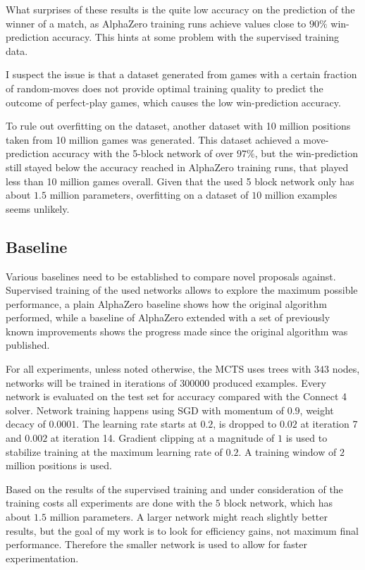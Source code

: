 \documentclass[12pt,onecolumn,oneside,titlepage]{article}
\begin{document}
What surprises of these results is the quite low accuracy on the prediction of the winner of a match, as AlphaZero training runs achieve values close to $90\%$ win-prediction accuracy.
This hints at some problem with the supervised training data.

I suspect the issue is that a dataset generated from games with a certain fraction of random-moves does not provide optimal training quality to predict the outcome of perfect-play games, which causes the low win-prediction accuracy.

To rule out overfitting on the dataset, another dataset with 10 million positions taken from 10 million games was generated. This dataset achieved a move-prediction accuracy with the 5-block network 
of over $97\%$, but the win-prediction still stayed below the accuracy reached in AlphaZero training runs, that played less than 10 million games overall.
Given that the used 5 block network only has about $1.5$ million parameters, overfitting on a dataset of $10$ million examples seems unlikely.

\subsection{Baseline}

Various baselines need to be established to compare novel proposals against. Supervised training of the used networks allows to explore the maximum possible performance, a plain AlphaZero baseline shows how the original algorithm performed, while a baseline
of AlphaZero extended with a set of previously known improvements shows the progress made since the original algorithm was published.

For all experiments, unless noted otherwise, the MCTS uses trees with $343$ nodes, networks will be trained in iterations of $300000$ produced examples. Every network is evaluated on the test set for accuracy compared with the Connect 4 solver.
Network training happens using SGD with momentum of $0.9$, weight decacy of $0.0001$. The learning rate starts at $0.2$, is dropped to $0.02$ at iteration 7 and $0.002$ at iteration 14. Gradient clipping at a magnitude of $1$ is used to stabilize training at the maximum learning rate of $0.2$.
A training window of $2$ million positions is used.


Based on the results of the supervised training and under consideration of the training costs all experiments are done with the $5$ block network, which has about $1.5$ million parameters. A larger network might reach slightly better results,
but the goal of my work is to look for efficiency gains, not maximum final performance. Therefore the smaller network is used to allow for faster experimentation.
\end{document}
